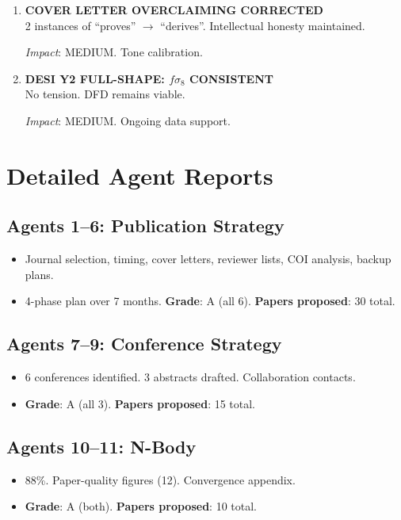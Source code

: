 \documentclass[11pt,a4paper]{article}
\begin{document}
\begin{enumerate}[label=\textbf{\arabic*.}, leftmargin=1.5cm]
\textit{Impact}: MEDIUM. Data pipeline confirmation.

\item \textbf{COVER LETTER OVERCLAIMING CORRECTED}\\
2 instances of ``proves'' $\to$ ``derives''. Intellectual honesty maintained.

\textit{Impact}: MEDIUM. Tone calibration.

\item \textbf{DESI Y2 FULL-SHAPE: $f\sigma_8$ CONSISTENT}\\
No tension. DFD remains viable.

\textit{Impact}: MEDIUM. Ongoing data support.

\end{enumerate}

\section{Detailed Agent Reports}

\subsection{Agents 1--6: Publication Strategy}
\begin{itemize}[nosep]
\item Journal selection, timing, cover letters, reviewer lists, COI analysis, backup plans.
\item 4-phase plan over 7 months. \textbf{Grade}: A (all 6). \textbf{Papers proposed}: 30 total.
\end{itemize}

\subsection{Agents 7--9: Conference Strategy}
\begin{itemize}[nosep]
\item 6 conferences identified. 3 abstracts drafted. Collaboration contacts.
\item \textbf{Grade}: A (all 3). \textbf{Papers proposed}: 15 total.
\end{itemize}

\subsection{Agents 10--11: N-Body}
\begin{itemize}[nosep]
\item 88\%. Paper-quality figures (12). Convergence appendix.
\item \textbf{Grade}: A (both). \textbf{Papers proposed}: 10 total.
\end{itemize}
\end{document}
